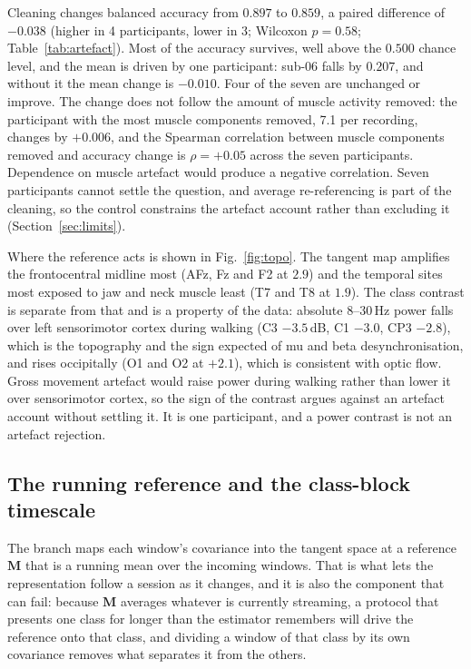 \documentclass[a4paper,fleqn]{cas-dc}
\begin{document}
Cleaning changes balanced accuracy from $0.897$ to $0.859$, a paired
difference of $-0.038$ (higher in 4 participants, lower in 3; Wilcoxon
$p=0.58$; Table~\ref{tab:artefact}). Most of the accuracy survives, well
above the $0.500$ chance level, and the mean is driven by one
participant: sub-06 falls by $0.207$, and without it the mean change is
$-0.010$. Four of the seven are unchanged or improve. The change does not follow the amount of
muscle activity removed: the participant with the most muscle components
removed, 7.1 per recording, changes by $+0.006$, and the Spearman
correlation between muscle components removed and accuracy change is
$\rho=+0.05$ across the seven participants. Dependence on muscle artefact
would produce a negative correlation. Seven participants cannot settle
the question, and average re-referencing is part of the cleaning, so the
control constrains the artefact account rather than excluding it
(Section~\ref{sec:limits}).

Where the reference acts is shown in Fig.~\ref{fig:topo}. The tangent map amplifies the frontocentral midline most (AFz, Fz and F2 at $2.9$) and the temporal sites most exposed to jaw and neck muscle least (T7 and T8 at $1.9$). The class contrast is separate from that and is a property of the data: absolute 8--30\,Hz power falls over left sensorimotor cortex during walking (C3 $-3.5$\,dB, C1 $-3.0$, CP3 $-2.8$), which is the topography and the sign expected of mu and beta desynchronisation, and rises occipitally (O1 and O2 at $+2.1$), which is consistent with optic flow. Gross movement artefact would raise power during walking rather than lower it over sensorimotor cortex, so the sign of the contrast argues against an artefact account without settling it. It is one participant, and a power contrast is not an artefact rejection.

\subsection{The running reference and the class-block timescale}\label{sec:rate}

The branch maps each window's covariance into the tangent space at a reference $\mathbf{M}$ that is a running mean over the incoming windows. That is what lets the representation follow a session as it changes, and it is also the component that can fail: because $\mathbf{M}$ averages whatever is currently streaming, a protocol that presents one class for longer than the estimator remembers will drive the reference onto that class, and dividing a window of that class by its own covariance removes what separates it from the others.
\end{document}
